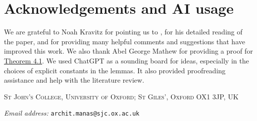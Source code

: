 \documentclass[11pt,a4paper]{article}
\begin{document}
\section{Acknowledgements and AI usage}
We are grateful to Noah Kravitz for pointing us to \cite{ABCK2024}, for his detailed reading of the paper, and for providing many helpful comments and suggestions that have improved this work. We also thank Abel George Mathew for providing a proof for \hyperref[thm:4:1]{Theorem 4.1}. We used ChatGPT as a sounding board for ideas, especially in the choices of explicit constants in the lemmas. It also provided proofreading assistance and help with the literature review. 
{\small


}
\begin{center}
{\scshape St John's College, University of Oxford; St Giles', Oxford OX1 3JP, UK\par}
\vspace{0.2em}
{\itshape Email address:} \texttt{archit.manas@sjc.ox.ac.uk}
\end{center}
\end{document}
